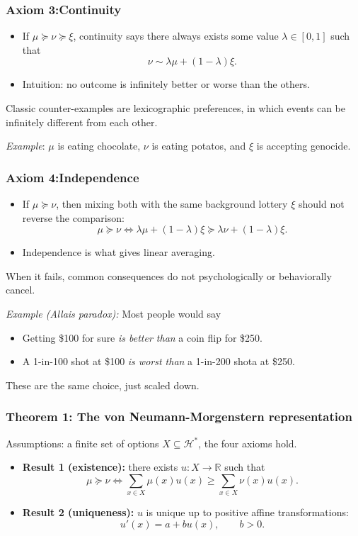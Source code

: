 \documentclass[10pt,a4paper]{beamer}
\newcommand{\Hcal}{\mathcal{H}}
\newcommand{\R}{\mathbb{R}}
\newcommand{\pref}{\succcurlyeq}
\newcommand{\indiff}{\sim}
\begin{document}
\begin{frame}
\frametitle{Axiom 3:Continuity}
\begin{itemize}
    \item If $\mu\pref\nu\pref\xi$, 
    continuity says there always exists some value $\lambda\in[0,1]$ such that
    $$
    \nu\indiff \lambda\mu+(1-\lambda)\xi.
    $$
    \pause
    \item Intuition: no outcome is infinitely better or worse than the others.
    \pause
\end{itemize}
\vspace{0.4cm}
Classic counter-examples are lexicographic preferences, in which events can be 
infinitely different from each other. 
\vspace{0.4cm}

\textit{Example}: $\mu$ is eating chocolate, $\nu$ is eating potatos, and $\xi$ is accepting genocide.
\end{frame}



\begin{frame}
\frametitle{Axiom 4:Independence}
\begin{itemize}
    \item If $\mu\pref\nu$, then mixing both with the same background lottery
    $\xi$ should not reverse the comparison:
    $$
    \mu\pref\nu
    \Longleftrightarrow
    \lambda\mu+(1-\lambda)\xi
    \pref
    \lambda\nu+(1-\lambda)\xi.
    $$
    \pause
    \item Independence is what gives linear averaging.
    \pause
\end{itemize}
When it fails, common consequences do not psychologically or behaviorally cancel.
\vspace{0.4cm}

\textit{Example (Allais paradox):} Most people would say
\begin{itemize}
    \item Getting \$100 for sure \textit{is better than} a coin flip for \$250.
    \item A 1-in-100 shot at \$100 \textit{is worst than} a 1-in-200 shota at \$250.
\end{itemize}
These are the same choice, just scaled down.
\end{frame}


\begin{frame}
\frametitle{Theorem 1: The von Neumann-Morgenstern representation}

Assumptions: a finite set of options $X\subseteq\Hcal^*$, 
the four axioms hold.
\begin{itemize}
    \item  \textbf{Result 1 (existence):} there exists $u:X\to\R$ such that
    $$
    \mu\pref\nu
    \Longleftrightarrow
    \sum_{x\in X}\mu(x)u(x)
    \geq
    \sum_{x\in X}\nu(x)u(x).
    $$
    \pause
    \item \textbf{Result 2 (uniqueness):} $u$ is unique up to positive affine transformations:
    $$
    u'(x)=a+bu(x),\qquad b>0.
    $$
\end{itemize}
\end{frame}
\end{document}
